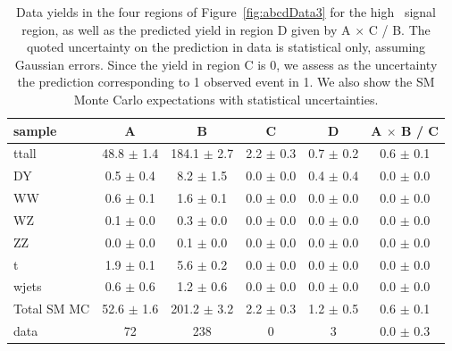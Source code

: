 \begin{table}[hbt]
\begin{center}
\caption{\label{tab:datayield3} 
Data yields in the four
regions of Figure~\ref{fig:abcdData3} for the high \Ht\ signal region, 
as well as the predicted yield in region D given
by A $\times$ C / B.  The quoted uncertainty
on the prediction in data is statistical only, assuming Gaussian errors.
Since the yield in region C is 0, we assess as the uncertainty the prediction
corresponding to 1 observed event in 1.
We also show the SM Monte Carlo expectations with statistical uncertainties.
}
\begin{tabular}{l||c|c|c|c||c}
\hline
           sample  &                A  &                B  &                C  &                D  &   A $\times$ B / C  \\
\hline
            ttall  & 48.8  $\pm$  1.4  &184.1  $\pm$  2.7  &  2.2  $\pm$  0.3  &  0.7  $\pm$  0.2  &  0.6  $\pm$  0.1   \\
               DY  &  0.5  $\pm$  0.4  &  8.2  $\pm$  1.5  &  0.0  $\pm$  0.0  &  0.4  $\pm$  0.4  &  0.0  $\pm$  0.0   \\
               WW  &  0.6  $\pm$  0.1  &  1.6  $\pm$  0.1  &  0.0  $\pm$  0.0  &  0.0  $\pm$  0.0  &  0.0  $\pm$  0.0   \\
               WZ  &  0.1  $\pm$  0.0  &  0.3  $\pm$  0.0  &  0.0  $\pm$  0.0  &  0.0  $\pm$  0.0  &  0.0  $\pm$  0.0   \\
               ZZ  &  0.0  $\pm$  0.0  &  0.1  $\pm$  0.0  &  0.0  $\pm$  0.0  &  0.0  $\pm$  0.0  &  0.0  $\pm$  0.0   \\
                t  &  1.9  $\pm$  0.1  &  5.6  $\pm$  0.2  &  0.0  $\pm$  0.0  &  0.0  $\pm$  0.0  &  0.0  $\pm$  0.0   \\
            wjets  &  0.6  $\pm$  0.6  &  1.2  $\pm$  0.6  &  0.0  $\pm$  0.0  &  0.0  $\pm$  0.0  &  0.0  $\pm$  0.0   \\
\hline
      Total SM MC  & 52.6  $\pm$  1.6  &201.2  $\pm$  3.2  &  2.2  $\pm$  0.3  &  1.2  $\pm$  0.5  &  0.6  $\pm$  0.1   \\
\hline
             data  &               72  &              238  &                0  &                3  &  0.0  $\pm$  0.3   \\
\hline
\end{tabular}
\end{center}
\end{table}

\newpage


